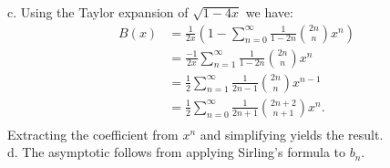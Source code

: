 \documentclass{article}
\begin{document}
c. Using the Taylor expansion of $\sqrt{1-4x}$ we have:
\begin{align*}
B(x) &= \frac{1}{2x}\left(1-\sum_{n=0}^\infty \frac{1}{1-2n}{2n \choose n}x^n\right) \\
&=\frac{-1}{2x}\sum_{n=1}^\infty \frac{1}{1-2n}{2n \choose n}x^n \\
&= \frac{1}{2}\sum_{n=1}^\infty \frac{1}{2n-1}{2n \choose n}x^{n-1} \\
&=\frac{1}{2}\sum_{n=0}^\infty \frac{1}{2n+1}{2n+2 \choose n+1}x^{n}. \\
\end{align*}
Extracting the coefficient from $x^n$ and simplifying yields the result. \\

d. The asymptotic follows from applying Sirling's formula to $b_n$.
\end{document}
